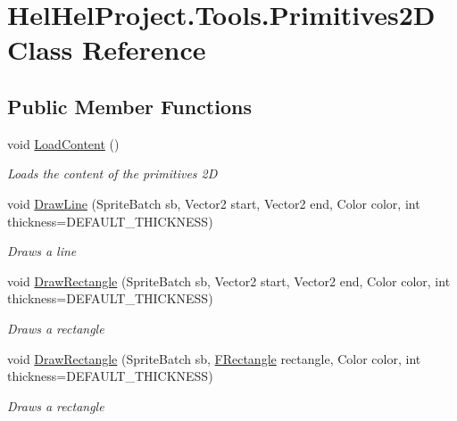\hypertarget{class_hel_hel_project_1_1_tools_1_1_primitives2_d}{}\section{Hel\+Hel\+Project.\+Tools.\+Primitives2\+D Class Reference}
\label{class_hel_hel_project_1_1_tools_1_1_primitives2_d}
\subsection*{Public Member Functions}
\begin{DoxyCompactItemize}
\item 
void \hyperlink{class_hel_hel_project_1_1_tools_1_1_primitives2_d_aec1356f76eecc6cac25c306c0b9b5922}{Load\+Content} ()
\begin{DoxyCompactList}\small\item\em Loads the content of the primitives 2\+D \end{DoxyCompactList}\item 
void \hyperlink{class_hel_hel_project_1_1_tools_1_1_primitives2_d_ae82e164b82ecd0a2c7265593f5be28e7}{Draw\+Line} (Sprite\+Batch sb, Vector2 start, Vector2 end, Color color, int thickness=D\+E\+F\+A\+U\+L\+T\+\_\+\+T\+H\+I\+C\+K\+N\+E\+S\+S)
\begin{DoxyCompactList}\small\item\em Draws a line \end{DoxyCompactList}\item 
void \hyperlink{class_hel_hel_project_1_1_tools_1_1_primitives2_d_a3d51f4539916142009a94dd4404b94e6}{Draw\+Rectangle} (Sprite\+Batch sb, Vector2 start, Vector2 end, Color color, int thickness=D\+E\+F\+A\+U\+L\+T\+\_\+\+T\+H\+I\+C\+K\+N\+E\+S\+S)
\begin{DoxyCompactList}\small\item\em Draws a rectangle \end{DoxyCompactList}\item 
void \hyperlink{class_hel_hel_project_1_1_tools_1_1_primitives2_d_ae479d467b422219b25c726ac1cadc8b8}{Draw\+Rectangle} (Sprite\+Batch sb, \hyperlink{class_hel_project_1_1_tools_1_1_f_rectangle}{F\+Rectangle} rectangle, Color color, int thickness=D\+E\+F\+A\+U\+L\+T\+\_\+\+T\+H\+I\+C\+K\+N\+E\+S\+S)
\begin{DoxyCompactList}\small\item\em Draws a rectangle \end{DoxyCompactList}\item 

\end{DoxyCompactItemize}

